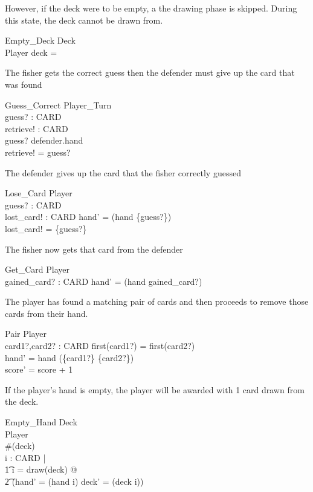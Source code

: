 \documentclass{article}
\begin{document}
However, if the deck were to be empty, a the drawing phase is skipped.
During this state, the deck cannot be drawn from.
\begin{schema}{Empty\_Deck}
    \Xi Deck \\
    \Xi Player
    \where
    deck = \emptyset
\end{schema}

The fisher gets the correct guess then the defender must
give up the card that was found
\begin{schema}{Guess\_Correct}
    \Xi Player\_Turn \\
    guess? : CARD \\
    retrieve! : CARD\\
    \where
    guess? \in defender.hand \\
    retrieve! = guess?
\end{schema}

The defender gives up the card that the fisher correctly guessed
\begin{schema}{Lose\_Card}
    \Delta Player \\
    guess? : CARD \\
    lost\_card! : \power CARD
    \where
    hand' = (hand \setminus \{guess?\}) \\
    lost\_card! = \{guess?\}
\end{schema}

The fisher now gets that card from the defender
\begin{schema}{Get\_Card}
    \Delta Player \\
    gained\_card? : \power CARD
    \where
    hand' = (hand \cup gained\_card?) \\
\end{schema}

The player has found a matching pair of cards and then proceeds
to remove those cards from their hand.
\begin{schema}{Pair}
    \Delta Player \\
    card1?,card2? : CARD
    \where
    first(card1?) = first(card2?) \\
    hand' = hand \setminus (\{card1?\} \cup \{card2?\}) \\ 
    score' = score + 1
\end{schema}

If the player's hand is empty, the player will be awarded with
1 card drawn from the deck.
\begin{schema}{Empty\_Hand}
    \Delta Deck \\
    \Delta Player \\
    \where
    \#(deck)  \\
    \forall i : \power CARD | \\
    \t1 i = draw(deck) @ \\
    \t2 (hand' = (hand \cup i) \land deck' = (deck \setminus i)) \\
\end{schema}
\end{document}

